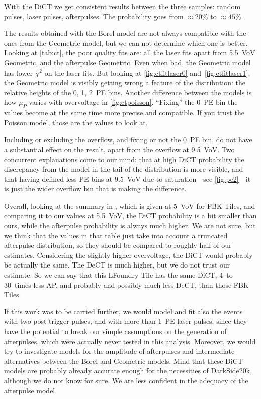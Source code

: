 With the DiCT we get consistent results between the three samples: random
pulses, laser pulses, afterpulses. The probability goes from $\approx\SI{20}\%$
to $\approx\SI{45}\%$.


The results obtained with the Borel model are not always compatible with the
ones from the Geometric model, but we can not determine which one is better.
Looking at \autoref{tab:ct}, the poor quality fits are: all the laser fits
apart from \SI{5.5}{VoV} Geometric, and the afterpulse Geometric. Even when
bad, the Geometric model has lower $\chi^2$ on the laser fits. But looking at
\autoref{fig:ctfitlaser0} and~\ref{fig:ctfitlaser1}, the Geometric model is
visibly getting wrong a feature of the distribution: the relative heights of
the 0, 1, 2~PE bins. Another difference between the models is how $\mu_P$
varies with overvoltage in \autoref{fig:ctpoisson}. ``Fixing'' the 0~PE bin the
values become at the same time more precise and compatible. If you trust the
Poisson model, those are the values to look at.

Including or excluding the overflow, and fixing or not the 0~PE bin, do not
have a substantial effect on the result, apart from the overflow at
\SI{9.5}{VoV}. Two concurrent explanations come to our mind: that at high DiCT
probability the discrepancy from the model in the tail of the distribution is
more visible, and that having defined less PE bins at \SI{9.5}{VoV} due to
saturation---see \autoref{fig:pe2}---it is just the wider overflow bin that is
making the difference.

Overall, looking at the summary in \cite[tab.~3.1~p.~62]{savarese2018}, which
is given at \SI{5}{VoV} for FBK Tiles, and comparing it to our values at
\SI{5.5}{VoV}, the DiCT probability is a bit smaller than ours, while the
afterpulse probability is always much higher. We are not sure, but we think
that the values in that table just take into account a truncated afterpulse
distribution, so they should be compared to roughly half of our estimates.
Considering the slightly higher overvoltage, the DiCT would probably be
actually the same. The DeCT is much higher, but we do not trust our estimate.
So we can say that this LFoundry Tile has the same DiCT, 4~to 30~times less AP,
and probably and possibly much less DeCT, than those FBK Tiles.

If this work was to be carried further, we would model and fit also the events
with two post-trigger pulses, and with more than 1~PE laser pulses, since they
have the potential to break our simple assumptions on the generation of
afterpulses, which were actually never tested in this analysis. Moreover, we
would try to investigate models for the amplitude of afterpulses and
intermediate alternatives between the Borel and Geometric models. Mind that
these DiCT models are probably already accurate enough for the necessities of
DarkSide20k, although we do not know for sure. We are less confident in the
adequacy of the afterpulse model.

